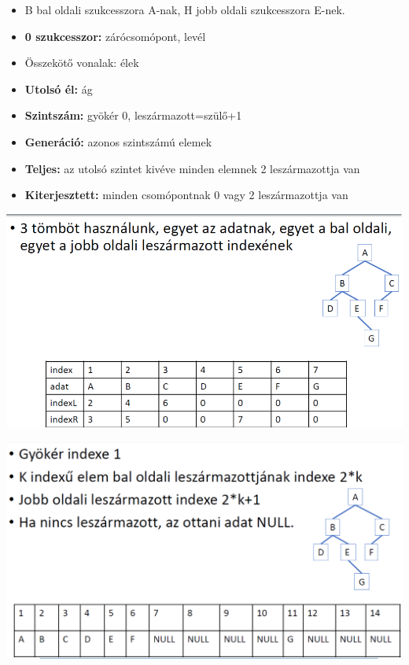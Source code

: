 \documentclass[11pt,a4paper]{article}
\begin{document}
\begin{tcolorbox}[colback=blue!5!white,colframe=blue!50!black,title= 22. Ismertesse a bináris fák szerkezetét és tárolási lehetőségeit számítógépen!]
\begin{itemize}
                    \item B bal oldali szukcesszora A-nak, H jobb oldali szukcesszora E-nek.
                    \item \textbf{0 szukcesszor:} zárócsomópont, levél
                    \item Összekötő vonalak: élek
                    \item \textbf{Utolsó él:} ág
                    \item \textbf{Szintszám:} gyökér 0, leszármazott=szülő+1
                    \item \textbf{Generáció:} azonos szintszámú elemek
                    \item \textbf{Teljes:} az utolsó szintet kivéve minden elemnek 2 leszármazottja van
                    \item \textbf{Kiterjesztett:} minden csomópontnak 0 vagy 2 leszármazottja van
                \end{itemize}
                \begin{center}
                    \includegraphics[scale = 0.3]{23_2.png}
                \end{center}
                \begin{center}
                    \includegraphics[scale = 0.25]{23_3.png}

\end{center}
\end{tcolorbox}
\end{document}
